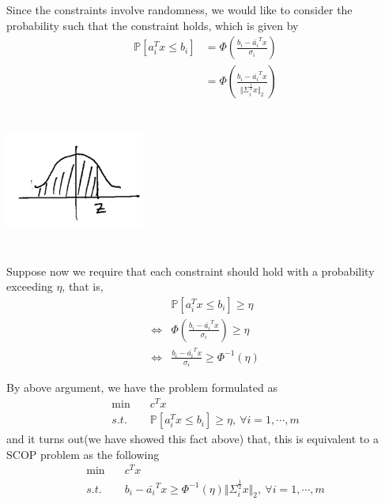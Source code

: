 Since the constraints involve randomness, we would like to consider the probability such that the constraint holds, which is given by
\begin{align*}
\mathbb{P}[a^T_i x\leq b_i]
&= \Phi\left(\frac{b_i - \bar{a_i}^Tx}{\sigma_i}\right)\\
&= \Phi\left(\frac{b_i - \bar{a_i}^Tx}{\Vert \Sigma_i^{\frac{1}{2}} x\Vert_2}\right)
\end{align*}

\begin{marginfigure}
\centering
\includegraphics[width=1.8in,height=1.8in]{figures/ch09/figure1118_2.png}
\end{marginfigure}

Suppose now we require that each constraint should hold with a probability exceeding $\eta$, that is,
\begin{align*}
& \mathbb{P}[a_i^Tx\leq b_i]\geq \eta\\
\Leftrightarrow&\Phi(\frac{b_i - \bar{a_i}^Tx}{\sigma_i})\geq \eta\\
\Leftrightarrow&\frac{b_i - \bar{a_i}^Tx}{\sigma_i}\geq \Phi^{-1}(\eta)
\end{align*}

By above argument, we have the problem formulated as 
\begin{align*}
\min \quad& c^Tx \\
s.t. \quad& \mathbb{P}[a_i^Tx\leq b_i]\geq \eta,\ \forall i = 1,\cdots,m
\end{align*}
and it turns out(we have showed this fact above) that, this is equivalent to a SCOP problem as the following
\begin{align*}
\min \quad& c^Tx \\
s.t. \quad& b_i - \bar{a_i}^Tx\geq \Phi^{-1}(\eta)\Vert\Sigma_i^{\frac{1}{2}}x\Vert_2,\ \forall i = 1,\cdots,m
\end{align*}




\vspace{0.5cm}
